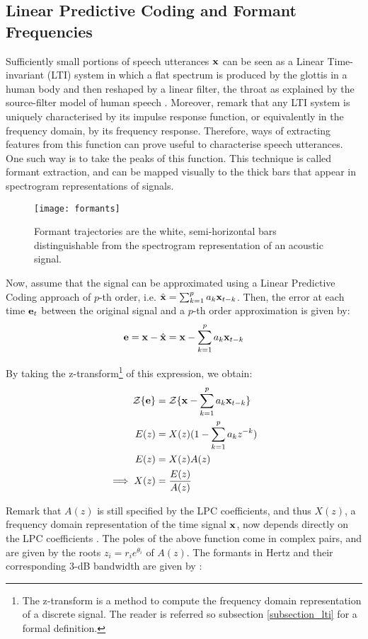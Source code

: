 \documentclass[../main.tex]{subfiles} \label{chapter_soa}
\begin{document}
\subsection{Linear Predictive Coding and Formant Frequencies} \label{subsection_formants}
Sufficiently small portions of speech utterances $\mathbf{x}$ can be seen as a Linear Time-invariant (LTI) system in which a flat spectrum is produced by the glottis in a human body and then reshaped by a linear filter, the throat as explained by the source-filter model of human speech \cite{Bello}. Moreover, remark that any LTI system is uniquely characterised by its impulse response function, or equivalently in the frequency domain, by its frequency response\cite{markel1976}. Therefore, ways of extracting features from this function can prove useful to characterise speech utterances. One such way is to take the peaks of this function. This technique is called formant extraction, and can be mapped visually to the thick bars that appear in spectrogram representations of signals.
\begin{figure}[t]
\centering
\texttt{[image: formants]}
\caption{Formant trajectories are the white, semi-horizontal bars distinguishable from the spectrogram representation of an acoustic signal.}
\label{fig_formants}
\end{figure}
\par Now, assume that the signal can be approximated using a Linear Predictive Coding approach of $p$-th order, i.e. $\hat{\mathbf{x}} = \sum_{k=1}^pa_k\mathbf{x}_{t-k}$. Then, the error at each time $\mathbf{e}_t$ between the original signal and a $p$-th order approximation is given by: 
\begin{align*}
\mathbf{e} = \mathbf{x} - \hat{\mathbf{x}} = \mathbf{x} - \sum_{k=1}^p{a_k \mathbf{x}_{t-k}}
\end{align*} 
\par By taking the z-transform\footnote{The z-transform is a method to compute the frequency domain representation of a discrete signal. The reader is referred so subsection \ref{subsection_lti} for a formal definition.} of this expression, we obtain:
\begin{align*}
\mathcal{Z}\{\mathbf{e}\} &= \mathcal{Z}\{\mathbf{x} - \sum_{k=1}^p{a_k \mathbf{x}_{t-k}}\}\\
E(z) &= X(z)(1-\sum_{k=1}^p{a_k z^{-k}})\\
E(z) &= X(z)A(z)\\
\implies X(z) &= \frac{E(z)}{A(z)}
\end{align*}
\par Remark that $A(z)$ is still specified by the LPC coefficients, and thus $X(z)$, a frequency domain representation of the time signal $\mathbf{x}$, now depends directly on the LPC coefficients \cite{Hosom2006}. The poles of the above function come in complex pairs, and are given by the roots $z_i = r_ie^{\theta_i}$ of $A(z)$. The formants in Hertz and their corresponding 3-dB bandwidth are given by \cite{Snell1993,Mathworks2015}:
\end{document}
